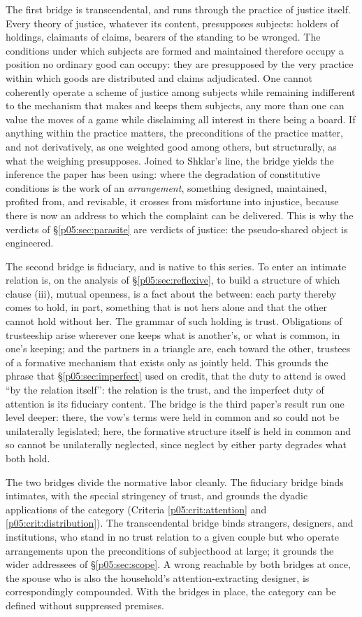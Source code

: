 The first bridge is transcendental, and runs through the practice of justice itself. Every theory of justice, whatever its content, presupposes subjects: holders of holdings, claimants of claims, bearers of the standing to be wronged. The conditions under which subjects are formed and maintained therefore occupy a position no ordinary good can occupy: they are presupposed by the very practice within which goods are distributed and claims adjudicated. One cannot coherently operate a scheme of justice among subjects while remaining indifferent to the mechanism that makes and keeps them subjects, any more than one can value the moves of a game while disclaiming all interest in there being a board. If anything within the practice matters, the preconditions of the practice matter, and not derivatively, as one weighted good among others, but structurally, as what the weighing presupposes. Joined to Shklar's line, the bridge yields the inference the paper has been using: where the degradation of constitutive conditions is the work of an \emph{arrangement}, something designed, maintained, profited from, and revisable, it crosses from misfortune into injustice, because there is now an address to which the complaint can be delivered. This is why the verdicts of §\ref{p05:sec:parasite} are verdicts of justice: the pseudo-shared object is engineered.

The second bridge is fiduciary, and is native to this series. To enter an intimate relation is, on the analysis of §\ref{p05:sec:reflexive}, to build a structure of which clause (iii), mutual openness, is a fact about the between: each party thereby comes to hold, in part, something that is not hers alone and that the other cannot hold without her. The grammar of such holding is trust. Obligations of trusteeship arise wherever one keeps what is another's, or what is common, in one's keeping; and the partners in a triangle are, each toward the other, trustees of a formative mechanism that exists only as jointly held. This grounds the phrase that §\ref{p05:sec:imperfect} used on credit, that the duty to attend is owed ``by the relation itself'': the relation is the trust, and the imperfect duty of attention is its fiduciary content. The bridge is the third paper's result run one level deeper: there, the vow's terms were held in common and so could not be unilaterally legislated; here, the formative structure itself is held in common and so cannot be unilaterally neglected, since neglect by either party degrades what both hold.

The two bridges divide the normative labor cleanly. The fiduciary bridge binds intimates, with the special stringency of trust, and grounds the dyadic applications of the category (Criteria \ref{p05:crit:attention} and \ref{p05:crit:distribution}). The transcendental bridge binds strangers, designers, and institutions, who stand in no trust relation to a given couple but who operate arrangements upon the preconditions of subjecthood at large; it grounds the wider addressees of §\ref{p05:sec:scope}. A wrong reachable by both bridges at once, the spouse who is also the household's attention-extracting designer, is correspondingly compounded. With the bridges in place, the category can be defined without suppressed premises.

